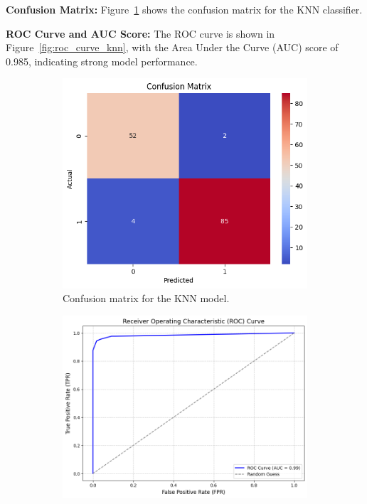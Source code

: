\documentclass[12pt]{article}
\begin{document}
\textbf{Confusion Matrix:} Figure~\ref{fig:confusion_matrix_knn} shows the confusion matrix for the KNN classifier.

\textbf{ROC Curve and AUC Score:} The ROC curve is shown in Figure~\ref{fig:roc_curve_knn}, with the Area Under the Curve (AUC) score of 0.985, indicating strong model performance.


\begin{figure}[h!]
    \centering
    \begin{subfigure}[b]{0.4\textwidth}
        \centering
        \includegraphics[width=\textwidth]{assets/knn/knn-cm.png}
        \caption{Confusion matrix for the KNN model.}
        \label{fig:confusion_matrix_knn}
    \end{subfigure}
    \hfill
    \begin{subfigure}[b]{0.4\textwidth}
        \centering
        \includegraphics[width=\textwidth]{assets/knn/knn-roc.png}

\end{subfigure}
\end{figure}
\end{document}

